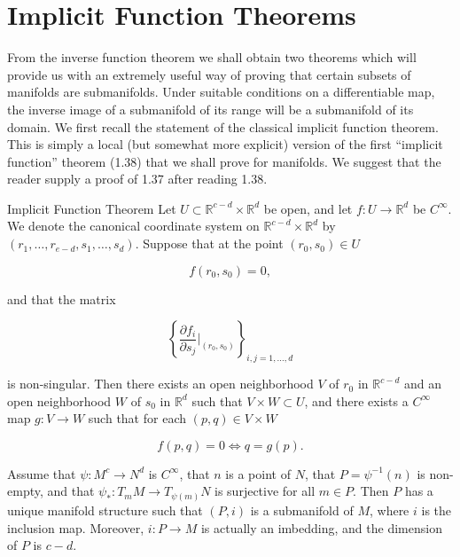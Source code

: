 \section{Implicit Function Theorems}


From the inverse function theorem we shall obtain two theorems which will provide us with an extremely useful way of proving that certain subsets of manifolds are submanifolds. Under suitable conditions on a differentiable map, the inverse image of a submanifold of its range will be a submanifold of its domain. We first recall the statement of the classical implicit function theorem. This is simply a local (but somewhat more explicit) version of the first ``implicit function'' theorem (1.38) that we shall prove for manifolds. We suggest that the reader supply a proof of 1.37 after reading 1.38. 

\begin{theorem}{Implicit Function Theorem}\label{thm:1.37}
	Let  $ U \subset \mathbb{R}^{c-d} \times \mathbb{R}^{d} $ be open, and let  $ f: U \to \mathbb{R}^{d} $ be  $ C^{\infty} $. We denote the canonical coordinate system on  $ \mathbb{R}^{c-d} \times \mathbb{R}^{d} $ by  $ (r_{1}, \ldots, r_{e-d}, s_{1}, \ldots, s_{d}) $. Suppose that at the point  $ (r_{0}, s_{0}) \in U $

	\[
		f(r_{0},s_{0})=0,
	\]

	and that the matrix

	\[
		\left\{\frac{\partial f_{i}}{\partial s_{j}}\bigg|_{(r_{0},s_{0})}\right\}_{i,j=1,\ldots,d}
	\]

	is non-singular. Then there exists an open neighborhood $V$ of $r_0$ in $\mathbb{R}^{c-d}$ and an open neighborhood $W$ of $s_0$ in $\mathbb{R}^d$ such that $V \times W \subset U$, and there exists a $C^\infty$ map $g: V \to W$ such that for each $(p,q) \in V \times W$

	\begin{equation}
		\tag{1}\label{eq:1.37:1}
		f(p,q)=0\iff q=g(p).
	\end{equation}

	\begin{center}
	\end{center}
\end{theorem}

\begin{theorem}\label{thm:1.38}
	Assume that $\psi\colon M^{c} \to N^{d}$ is $C^{\infty}$, that $n$ is a point of $N$, that $P = \psi^{-1}(n)$ is non-empty, and that $\psi_{*}: T_{m} M \to T_{\psi(m)} N$ is surjective for all $m \in P$. Then $P$ has a unique manifold structure such that $(P, i)$ is a submanifold of $M$, where $i$ is the inclusion map. Moreover, $i: P \to M$ is actually an imbedding, and the dimension of $P$ is $c - d$.

\end{theorem}

